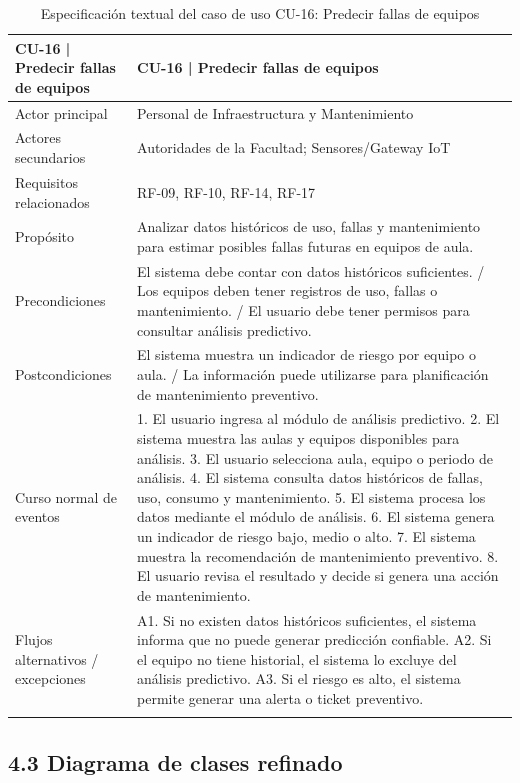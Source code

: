 \begingroup
\small
\begin{longtable}{|p{7.8cm}|p{7.8cm}|}
\hline
CU-16 | Predecir fallas de equipos & CU-16 | Predecir fallas de equipos \\ \hline
Actor principal & Personal de Infraestructura y Mantenimiento \\ \hline
Actores secundarios & Autoridades de la Facultad; Sensores/Gateway IoT \\ \hline
Requisitos relacionados & RF-09, RF-10, RF-14, RF-17 \\ \hline
Propósito & Analizar datos históricos de uso, fallas y mantenimiento para estimar posibles fallas futuras en equipos de aula. \\ \hline
Precondiciones & El sistema debe contar con datos históricos suficientes. / Los equipos deben tener registros de uso, fallas o mantenimiento. / El usuario debe tener permisos para consultar análisis predictivo. \\ \hline
Postcondiciones & El sistema muestra un indicador de riesgo por equipo o aula. / La información puede utilizarse para planificación de mantenimiento preventivo. \\ \hline
Curso normal de eventos & 1. El usuario ingresa al módulo de análisis predictivo. 2. El sistema muestra las aulas y equipos disponibles para análisis. 3. El usuario selecciona aula, equipo o periodo de análisis. 4. El sistema consulta datos históricos de fallas, uso, consumo y mantenimiento. 5. El sistema procesa los datos mediante el módulo de análisis. 6. El sistema genera un indicador de riesgo bajo, medio o alto. 7. El sistema muestra la recomendación de mantenimiento preventivo. 8. El usuario revisa el resultado y decide si genera una acción de mantenimiento. \\ \hline
Flujos alternativos / excepciones & A1. Si no existen datos históricos suficientes, el sistema informa que no puede generar predicción confiable. A2. Si el equipo no tiene historial, el sistema lo excluye del análisis predictivo. A3. Si el riesgo es alto, el sistema permite generar una alerta o ticket preventivo. \\ \hline
\caption{Especificación textual del caso de uso CU-16: Predecir fallas de equipos}
\end{longtable}
\endgroup

\subsection*{4.3 Diagrama de clases refinado}

